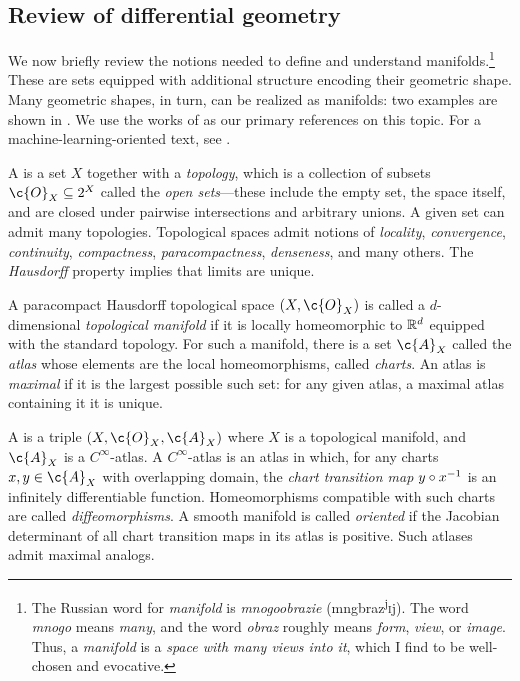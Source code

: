 \documentclass[11pt]{book}
\begin{document}
\subsection{Review of differential geometry}
We now briefly review the notions needed to define and understand manifolds.\footnote{The Russian word for \emph{manifold} is \emph{mnogoobrazie} (mngbr{\textquotesingle}az\textsuperscript{j}\textsc{i}j). The word \emph{mnogo} means \emph{many}, and the word \emph{obraz} roughly means \emph{form}, \emph{view}, or \emph{image}. 
Thus, a \emph{manifold} is a \emph{space with many views into it}, which I find to be well-chosen and evocative.}
These are sets equipped with additional structure encoding their geometric shape.
Many geometric shapes, in turn, can be realized as manifolds: two examples are shown in .
We use the works of \textcite{lee10,lee12,lee18} as our primary references on this topic.
For a machine-learning-oriented text, see \textcite{bronstein21}.

A  is a set $X$ together with a \emph{topology}, which is a collection of subsets $\c{O}_X \subseteq 2^X$ called the \emph{open sets}---these include the empty set, the space itself, and are closed under pairwise intersections and arbitrary unions.
A given set can admit many topologies.
Topological spaces admit notions of \emph{locality}, \emph{convergence}, \emph{continuity}, \emph{compactness}, \emph{paracompactness}, \emph{denseness}, and many others.
The \emph{Hausdorff} property implies that limits are unique.

\label{ntn:manifold}
A paracompact Hausdorff topological space $(X,\c{O}_X)$ is called a $d$-dimensional \emph{topological manifold} if it is locally homeomorphic to $\mathbb{R}^d$ equipped with the standard topology.
For such a manifold, there is a set $\c{A}_X$ called the \emph{atlas} whose elements are the local homeomorphisms, called \emph{charts}.
An atlas is \emph{maximal} if it is the largest possible such set: for any given atlas, a maximal atlas containing it it is unique.

A  is a triple  $(X,\c{O}_X,\c{A}_X)$ where $X$ is a topological manifold, and $\c{A}_X$ is a $C^\infty$-atlas.
A $C^\infty$-atlas is an atlas in which, for any charts $x,y \in \c{A}_X$ with overlapping domain, the \emph{chart transition map} $y\circ x^{-1}$ is an infinitely differentiable function.
Homeomorphisms compatible with such charts are called \emph{diffeomorphisms}.
A smooth manifold is called \emph{oriented} if the Jacobian determinant of all chart transition maps in its atlas is positive.
Such atlases admit maximal analogs.
\end{document}
